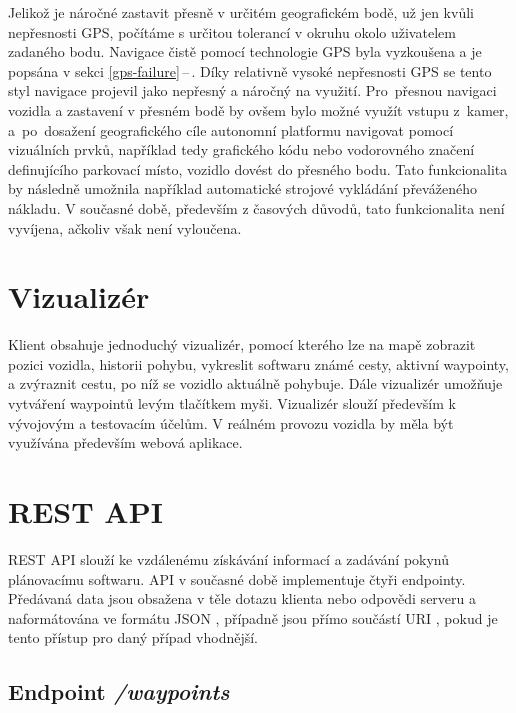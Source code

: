 \documentclass[czech, bachelor]{diploma}
\newcommand{\peteref}[1]{\ref{#1}\,--\,\nameref{#1}}
\begin{document}
Jelikož je náročné zastavit přesně v určitém geografickém bodě, už jen kvůli nepřesnosti GPS, počítáme s určitou tolerancí
v okruhu okolo uživatelem zadaného bodu. Navigace čistě pomocí technologie GPS byla vyzkoušena a je popsána v sekci
\peteref{gps-failure}. Díky relativně vysoké nepřesnosti GPS se tento styl navigace projevil jako nepřesný a náročný na využití.
Pro~přesnou navigaci vozidla a zastavení v přesném bodě by ovšem bylo možné využít vstupu z~kamer, a~po~dosažení geografického
cíle autonomní platformu navigovat pomocí vizuálních prvků, například tedy grafického kódu nebo vodorovného značení definujícího
parkovací místo, vozidlo dovést do přesného bodu. Tato funkcionalita by následně umožnila například automatické strojové vykládání
převáženého nákladu. V současné době, především z časových důvodů, tato funkcionalita není vyvíjena, ačkoliv však není vyloučena.

\section{Vizualizér} \label{visualizer}

Klient obsahuje jednoduchý vizualizér, pomocí kterého lze na mapě zobrazit pozici vozidla, historii pohybu, vykreslit
softwaru známé cesty, aktivní waypointy, a zvýraznit cestu, po níž se vozidlo aktuálně pohybuje. Dále vizualizér umožňuje
vytváření waypointů levým tlačítkem myši. Vizualizér slouží především k vývojovým a testovacím účelům. V reálném provozu vozidla
by měla být využívána především webová aplikace.

\section{REST API} \label{rest-api}

REST API \cite{rest-source} slouží ke vzdálenému získávání informací a zadávání pokynů plánovacímu softwaru. API v současné době
implementuje čtyři endpointy. Předávaná data jsou obsažena v těle dotazu klienta nebo odpovědi serveru a naformátována ve formátu
JSON \cite{json-source}, případně jsou přímo součástí URI \cite{http-source}, pokud je tento přístup pro daný případ vhodnější.

\subsection{Endpoint \emph{/waypoints}}
\end{document}
